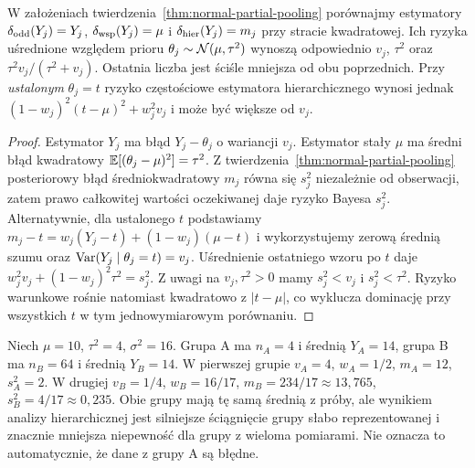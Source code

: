 \begin{twierdzenie}
\label{thm:shrinkage-bayes-risk}
W założeniach twierdzenia~\ref{thm:normal-partial-pooling}
porównajmy estymatory $\delta_{\rm odd}(Y_j)=Y_j$,
$\delta_{\rm wsp}(Y_j)=\mu$ i
$\delta_{\rm hier}(Y_j)=m_j$ przy stracie kwadratowej.
Ich ryzyka uśrednione względem prioru $\theta_j\sim\mathcal N(\mu,\tau^2)$
wynoszą odpowiednio $v_j$, $\tau^2$ oraz
$\tau^2v_j/(\tau^2+v_j)$.
Ostatnia liczba jest ściśle mniejsza od obu poprzednich.
Przy \emph{ustalonym} $\theta_j=t$ ryzyko częstościowe estymatora
hierarchicznego wynosi jednak
$(1-w_j)^2(t-\mu)^2+w_j^2v_j$ i może być większe od $v_j$.
\end{twierdzenie}
\begin{proof}
Estymator $Y_j$ ma błąd $Y_j-\theta_j$ o wariancji $v_j$.
Estymator stały $\mu$ ma średni błąd kwadratowy
$\mathbb E[(\theta_j-\mu)^2]=\tau^2$.
Z twierdzenia~\ref{thm:normal-partial-pooling} posteriorowy
błąd średniokwadratowy $m_j$ równa się $s_j^2$ niezależnie od
obserwacji, zatem prawo całkowitej wartości oczekiwanej
daje ryzyko Bayesa $s_j^2$.
Alternatywnie, dla ustalonego $t$ podstawiamy
$m_j-t=w_j(Y_j-t)+(1-w_j)(\mu-t)$ i wykorzystujemy
zerową średnią szumu oraz $\operatorname{Var}(Y_j\mid\theta_j=t)=v_j$.
Uśrednienie ostatniego wzoru po $t$ daje
$w_j^2v_j+(1-w_j)^2\tau^2=s_j^2$.
Z uwagi na $v_j,\tau^2>0$ mamy
$s_j^2<v_j$ i $s_j^2<\tau^2$. Ryzyko warunkowe rośnie
natomiast kwadratowo z $|t-\mu|$, co wyklucza dominację
przy wszystkich $t$ w tym jednowymiarowym porównaniu.
\end{proof}

\begin{przyklad}
Niech $\mu=10$, $\tau^2=4$, $\sigma^2=16$.
Grupa A ma $n_A=4$ i średnią $Y_A=14$, grupa B ma
$n_B=64$ i średnią $Y_B=14$. W pierwszej grupie
$v_A=4$, $w_A=1/2$, $m_A=12$, $s_A^2=2$.
W drugiej $v_B=1/4$, $w_B=16/17$, $m_B=234/17\approx13{,}765$,
$s_B^2=4/17\approx0{,}235$.
Obie grupy mają tę samą średnią z próby, ale wynikiem
analizy hierarchicznej jest silniejsze ściągnięcie grupy
słabo reprezentowanej i znacznie mniejsza niepewność
dla grupy z wieloma pomiarami. Nie oznacza to automatycznie,
że dane z grupy A są błędne.
\end{przyklad}


